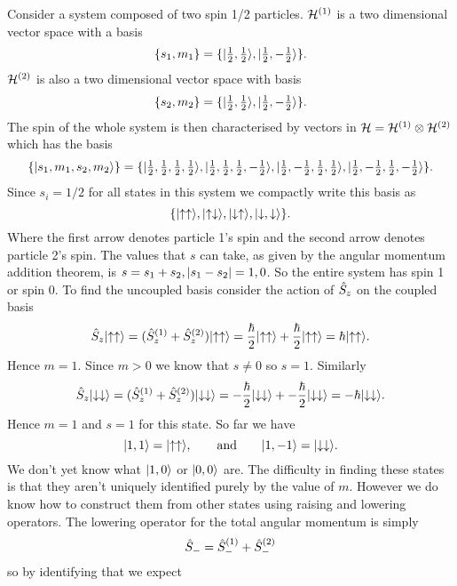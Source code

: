 \begin{example}
    Consider a system composed of two spin 1/2 particles.
    \(\mathcal{H}^{(1)}\) is a two dimensional vector space with a basis
    \[\{s_1, m_1\} = \{\vert {\tfrac{1}{2}, \tfrac{1}{2}} \rangle, \vert {\tfrac{1}{2}, -\tfrac{1}{2}} \rangle\}.\]
    \(\mathcal{H}^{(2)}\) is also a two dimensional vector space with basis
    \[\{s_2, m_2\} = \{\vert {\tfrac{1}{2}, \tfrac{1}{2}} \rangle, \vert {\tfrac{1}{2}, -\tfrac{1}{2}} \rangle\}.\]
    The spin of the whole system is then characterised by vectors in \(\mathcal{H} = \mathcal{H}^{(1)}\otimes\mathcal{H}^{(2)}\) which has the basis
    \[\{\vert {s_1, m_1, s_2, m_2} \rangle\} = \{\vert {\tfrac{1}{2},\tfrac{1}{2},\tfrac{1}{2},\tfrac{1}{2}} \rangle, \vert {\tfrac{1}{2},\tfrac{1}{2},\tfrac{1}{2},-\tfrac{1}{2}} \rangle, \vert {\tfrac{1}{2},-\tfrac{1}{2},\tfrac{1}{2},\tfrac{1}{2}} \rangle, \vert {\tfrac{1}{2},-\tfrac{1}{2},\tfrac{1}{2},-\tfrac{1}{2}} \rangle\}.\]
    Since \(s_i = 1/2\) for all states in this system we compactly write this basis as
    \[\{\vert {\uparrow\uparrow} \rangle, \vert {\uparrow\downarrow} \rangle, \vert {\downarrow\uparrow} \rangle, \vert {\downarrow, \downarrow} \rangle\}.\]
    Where the first arrow denotes particle 1's spin and the second arrow denotes particle 2's spin.
    The values that \(s\) can take, as given by the angular momentum addition theorem, is \(s = s_1 + s_2, \abs{s_1 - s_2} = 1, 0\).
    So the entire system has spin 1 or spin 0.
    To find the uncoupled basis consider the action of \(\hat{S}_z\) on the coupled basis
    \[\hat{S}_z\vert {\uparrow\uparrow} \rangle = (\hat{S}^{(1)}_z + \hat{S}^{(2)}_z)\vert {\uparrow\uparrow} \rangle = \frac{\hbar}{2}\vert {\uparrow\uparrow} \rangle + \frac{\hbar}{2}\vert {\uparrow\uparrow} \rangle = \hbar\vert {\uparrow\uparrow} \rangle.\]
    Hence \(m = 1\).
    Since \(m > 0\) we know that \(s \ne 0\) so \(s = 1\).
    Similarly
    \[\hat{S}_z\vert {\downarrow\downarrow} \rangle = (\hat{S}^{(1)}_z + \hat{S}^{(2)}_z)\vert {\downarrow\downarrow} \rangle = -\frac{\hbar}{2}\vert {\downarrow\downarrow} \rangle + -\frac{\hbar}{2}\vert {\downarrow\downarrow} \rangle = -\hbar\vert {\downarrow\downarrow} \rangle.\]
    Hence \(m = 1\) and \(s = 1\) for this state.
    So far we have
    \[\vert {1,1} \rangle = \vert {\uparrow\uparrow} \rangle, \qquad\text{and}\qquad \vert {1,-1} \rangle = \vert {\downarrow\downarrow} \rangle.\]
    We don't yet know what \(\vert {1, 0} \rangle\) or \(\vert {0, 0} \rangle\) are.
    The difficulty in finding these states is that they aren't uniquely identified purely by the value of \(m\).
    However we do know how to construct them from other states using raising and lowering operators.
    The lowering operator for the total angular momentum is simply
    \[\hat{S}_- = \hat{S}^{(1)}_- + \hat{S}^{(2)}_-\]
    so by identifying that we expect

\end{example}
